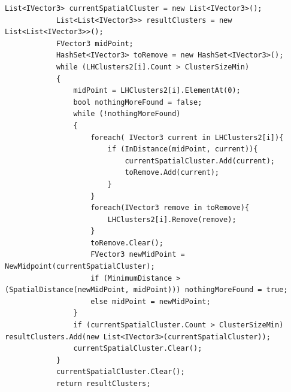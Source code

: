 \begin{lstlisting}[caption = Code zur Berechnung der räumlichen Cluster, label = lst:spatclust_code]
List<IVector3> currentSpatialCluster = new List<IVector3>();
            List<List<IVector3>> resultClusters = new List<List<IVector3>>();
            FVector3 midPoint;
            HashSet<IVector3> toRemove = new HashSet<IVector3>();
            while (LHClusters2[i].Count > ClusterSizeMin)
            {
                midPoint = LHClusters2[i].ElementAt(0);
                bool nothingMoreFound = false;
                while (!nothingMoreFound)
                {
                    foreach( IVector3 current in LHClusters2[i]){
                        if (InDistance(midPoint, current)){
                            currentSpatialCluster.Add(current);
                            toRemove.Add(current);
                        }
                    }
                    foreach(IVector3 remove in toRemove){
                        LHClusters2[i].Remove(remove);
                    }
                    toRemove.Clear();
                    FVector3 newMidPoint = NewMidpoint(currentSpatialCluster);
                    if (MinimumDistance > (SpatialDistance(newMidPoint, midPoint))) nothingMoreFound = true;
                    else midPoint = newMidPoint;
                }
                if (currentSpatialCluster.Count > ClusterSizeMin) resultClusters.Add(new List<IVector3>(currentSpatialCluster));
                currentSpatialCluster.Clear();
            }
            currentSpatialCluster.Clear();
            return resultClusters;

\end{lstlisting}


